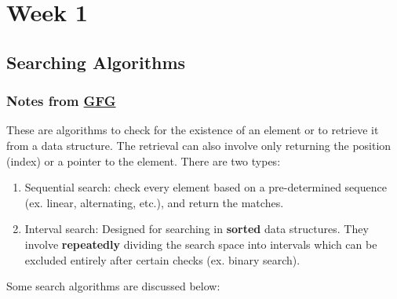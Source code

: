 \documentclass{report}
\begin{document}
\chapter{Week 1}
\section{Searching Algorithms}
\subsection*{Notes from \href{https://www.geeksforgeeks.org/searching-algorithms/}{GFG}}
These are algorithms to check for the existence of an element or to retrieve it from
a data structure. The retrieval can also involve only returning the position (index)
or a pointer to the element. There are two types:
\begin{enumerate}
    \item Sequential search: check every element based on a pre-determined sequence (ex. linear, alternating, etc.),
    and return the matches.
    \item Interval search: Designed for searching in \textbf{sorted} data structures.
    They involve \textbf{repeatedly} dividing the search space into intervals which
    can be excluded entirely after certain checks (ex. binary search).
\end{enumerate}
Some search algorithms are discussed below:
\end{document}
